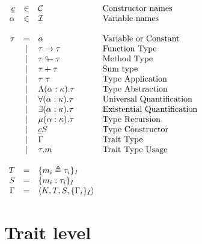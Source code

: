 \documentclass{article}[11pt]
\begin{document}
    \begin{math}
        \begin{array}{rclp{5cm}}
            \underline{c} & \in  & {\cal C}                     & Constructor names          \\
            \alpha        & \in  & {\cal I}                     & Variable names             \\
            \\
            \tau & =
            & \alpha                              & Variable or Constant              \\
            & \mid & \tau \rightarrow \tau        & Function Type              \\
            & \mid & \tau \looparrowright \tau    & Method Type              \\
            & \mid & \tau + \tau                  & Sum type              \\
            & \mid & \tau~\tau                    & Type Application              \\
            & \mid & \Lambda (\alpha:\kappa).\tau & Type Abstraction              \\
            & \mid & \forall (\alpha:\kappa).\tau & Universal Quantification              \\
            & \mid & \exists (\alpha:\kappa).\tau & Existential Quantification              \\
            & \mid & \mu(\alpha:\kappa).\tau      & Type Recursion              \\
            & \mid & \underline{c} S              & Type Constructor              \\
            & \mid & \Gamma                       & Trait Type              \\
            & \mid & \tau . m                     & Trait Type Usage              \\
            \\
            T       & =   & \{ m_i \triangleq \tau_i \}_I     \\
            S       & =   & \{ m_i : \tau_i \}_I              \\
            \Gamma  & =   & \langle K, T, S, \{ \Gamma_i \}_I \rangle        \\
        \end{array}
    \end{math}


    \section{Trait level}\label{sec:trait-level}
\end{document}
